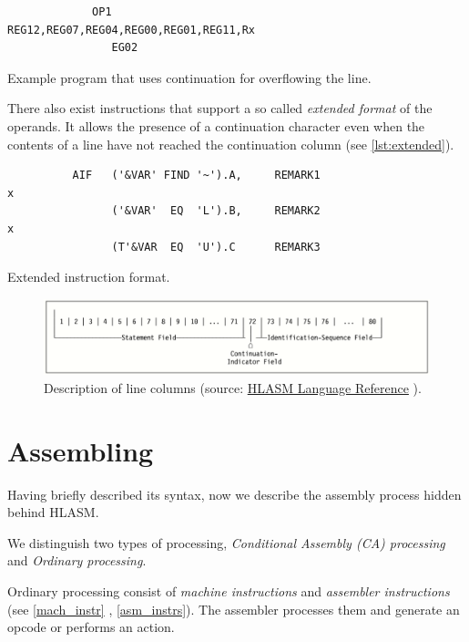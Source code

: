 \begin{listing}[p]
	\begin{verbatim}
             OP1                   REG12,REG07,REG04,REG00,REG01,REG11,Rx
                EG02
	\end{verbatim}
	\caption{Example program that uses continuation for overflowing the line.}
	\label{lst:overflow}
\end{listing}

There also exist instructions that support a so called \emph{extended format} of the operands. It allows the presence of a continuation character even when the contents of a line have not reached the continuation column (see \cref{lst:extended}).

\begin{listing}[p]
\begin{verbatim}
          AIF   ('&VAR' FIND '~').A,     REMARK1                        x
                ('&VAR'  EQ  'L').B,     REMARK2                        x
                (T'&VAR  EQ  'U').C      REMARK3 
\end{verbatim}
\caption{Extended instruction format.}
\label{lst:extended}
\end{listing}

\begin{figure}
	\includegraphics[width=\textwidth]{img/line}
	\caption{Description of line columns (source: \href{https://www-01.ibm.com/servers/resourcelink/svc00100.nsf/pages/zOSV2R3sc264940/$file/asmr1023.pdf}{HLASM Language Reference} ).}
	\label{fig01:line}
\end{figure}


\section{Assembling}
\label{Assembling}

Having briefly described its syntax, now we describe the assembly process hidden behind HLASM. 

We distinguish two types of processing, \emph{Conditional Assembly (CA) processing} and \emph{Ordinary processing}.

Ordinary processing consist of \emph{machine instructions} and \emph{assembler instructions} (see \cref{mach_instr} , \cref{asm_instrs}). The assembler processes them and generate an opcode or performs an action.

